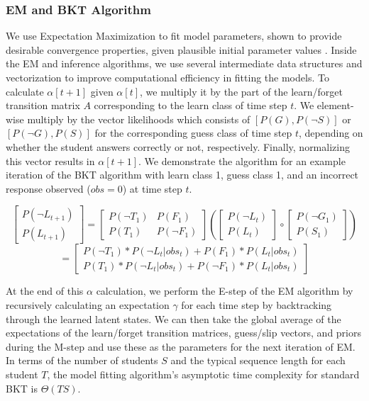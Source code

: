 \documentclass{edm_article}
\begin{document}
\subsubsection{EM and BKT Algorithm}
We use Expectation Maximization to fit model parameters, shown to provide desirable convergence properties, given plausible initial parameter values \cite{pardos2010navigating}. Inside the EM and inference algorithms, we use several intermediate data structures and vectorization to improve computational efficiency in fitting the models. To calculate $\alpha[t+1]$ given $\alpha[t]$, we multiply it by the part of the learn/forget transition matrix $A$ corresponding to the learn class of time step $t$. We element-wise multiply by the vector likelihoods which consists of $[P(G), P(\neg{S})]$ or $[P(\neg{G}), P(S)]$ for the corresponding guess class of time step $t$, depending on whether the student answers correctly or not, respectively. Finally, normalizing this vector results in $\alpha[t+1]$. We demonstrate the algorithm for an example iteration of the BKT algorithm with learn class 1, guess class 1, and an incorrect response observed ($obs = 0$) at time step $t$. 


$$
{
\begin{bmatrix}
    P(\neg{L}_{t+1})\\
    P(L_{t+1})
\end{bmatrix} 
}
=
\begin{bmatrix}
    P(\neg{T}_1)  &  P(F_1)\\
    P(T_1)  &  P(\neg{F}_1)
\end{bmatrix}(
\begin{bmatrix}
    P(\neg{L}_t)\\
    P(L_t)
\end{bmatrix} 
\circ
\begin{bmatrix}
    P(\neg{G}_1)\\
    P(S_1)
\end{bmatrix})
$$
$$
=
\begin{bmatrix}
    P(\neg{T}_1)*P(\neg{L}_t|obs_t) + P(F_1)*P(L_t|obs_t)      \\
    P(T_1)*P(\neg{L}_t|obs_t) + P(\neg{F}_1)*P(L_t|obs_t)   
\end{bmatrix} 
$$

At the end of this $\alpha$ calculation, we perform the E-step of the EM algorithm by recursively calculating an expectation $\gamma$ for each time step by backtracking through the learned latent states. We can then take the global average of the expectations of the learn/forget transition matrices, guess/slip vectors, and priors during the M-step and use these as the parameters for the next iteration of EM. In terms of the number of students $S$ and the typical sequence length for each student $T$, the model fitting algorithm's asymptotic time complexity for standard BKT is $\Theta(TS)$.
\end{document}
